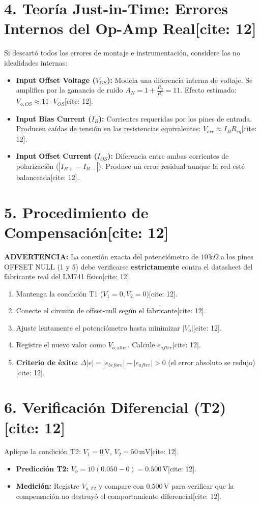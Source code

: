 \documentclass[11pt, a4paper]{article}
\begin{document}
\section*{4. Teoría Just-in-Time: Errores Internos del Op-Amp Real[cite: 12]}
Si descartó todos los errores de montaje e instrumentación, considere las no idealidades internas:
\begin{itemize}
    \item \textbf{Input Offset Voltage ($V_{OS}$):} Modela una diferencia interna de voltaje. Se amplifica por la ganancia de ruido $A_N = 1 + \frac{R_2}{R_1} = 11$. Efecto estimado: $V_{o,OS} \approx 11 \cdot V_{OS}$[cite: 12].
    \item \textbf{Input Bias Current ($I_B$):} Corrientes requeridas por los pines de entrada. Producen caídas de tensión en las resistencias equivalentes: $V_{err} \approx I_B R_{eq}$[cite: 12].
    \item \textbf{Input Offset Current ($I_{OS}$):} Diferencia entre ambas corrientes de polarización ($|I_{B+} - I_{B-}|$). Produce un error residual aunque la red esté balanceada[cite: 12].
\end{itemize}

\section*{5. Procedimiento de Compensación[cite: 12]}
\textbf{ADVERTENCIA:} La conexión exacta del potenciómetro de $10\,\text{k}\Omega$ a los pines OFFSET NULL (1 y 5) debe verificarse \textbf{estrictamente} contra el datasheet del fabricante real del LM741 físico[cite: 12].
\begin{enumerate}
    \item Mantenga la condición T1 ($V_1 = 0, V_2 = 0$)[cite: 12].
    \item Conecte el circuito de offset-null según el fabricante[cite: 12].
    \item Ajuste lentamente el potenciómetro hasta minimizar $|V_o|$[cite: 12].
    \item Registre el nuevo valor como $V_{o,\mathrm{after}}$. Calcule $e_{after}$[cite: 12].
    \item \textbf{Criterio de éxito:} $\Delta|e| = |e_{before}| - |e_{after}| > 0$ (el error absoluto se redujo)[cite: 12].
\end{enumerate}

\section*{6. Verificación Diferencial (T2)[cite: 12]}
Aplique la condición T2: $V_1 = 0\,\text{V}$, $V_2 = 50\,\text{mV}$[cite: 12].
\begin{itemize}
    \item \textbf{Predicción T2:} $V_o = 10(0.050 - 0) = 0.500\,\text{V}$[cite: 12].
    \item \textbf{Medición:} Registre $V_{o,T2}$ y compare con $0.500\,\text{V}$ para verificar que la compensación no destruyó el comportamiento diferencial[cite: 12].
\end{itemize}
\end{document}
